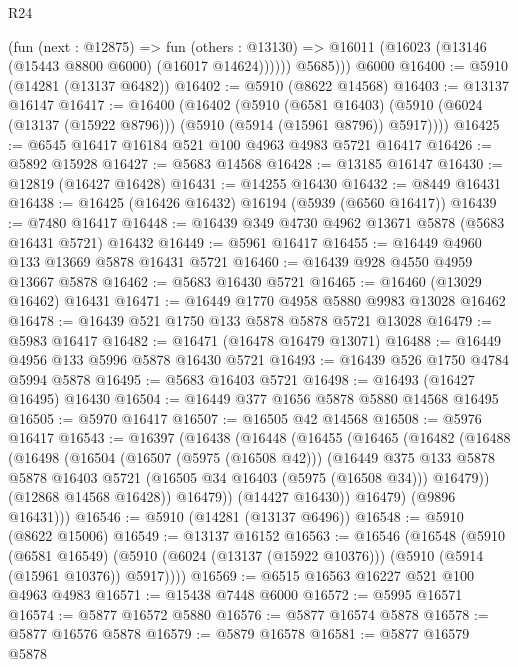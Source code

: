 \begin{lexlean}{R24}
\begin{coremodule}
            (fun (next : @12875) =>
            fun (others : @13130) =>
            @16011 (@16023 (@13146 (@15443 @8800 @6000) (@16017 @14624))))))
          @5685)))
    @6000
@16400 := @5910 (@14281 (@13137 @6482))
@16402 := @5910 (@8622 @14568)
@16403 := @13137 @16147
@16417 := @16400
    (@16402
      (@5910
        (@6581 @16403)
        (@5910 (@6024 (@13137 (@15922 @8796))) (@5910 (@5914 (@15961 @8796)) @5917))))
@16425 := @6545 @16417 @16184 @521 @100 @4963 @4983 @5721 @16417
@16426 := @5892 @15928
@16427 := @5683 @14568
@16428 := @13185 @16147
@16430 := @12819 (@16427 @16428)
@16431 := @14255 @16430
@16432 := @8449 @16431
@16438 := @16425 (@16426 @16432) @16194 (@5939 (@6560 @16417))
@16439 := @7480 @16417
@16448 := @16439 @349 @4730 @4962 @13671 @5878 (@5683 @16431 @5721) @16432
@16449 := @5961 @16417
@16455 := @16449 @4960 @133 @13669 @5878 @16431 @5721
@16460 := @16439 @928 @4550 @4959 @13667 @5878
@16462 := @5683 @16430 @5721
@16465 := @16460 (@13029 @16462) @16431
@16471 := @16449 @1770 @4958 @5880 @9983 @13028 @16462
@16478 := @16439 @521 @1750 @133 @5878 @5878 @5721 @13028
@16479 := @5983 @16417
@16482 := @16471 (@16478 @16479 @13071)
@16488 := @16449 @4956 @133 @5996 @5878 @16430 @5721
@16493 := @16439 @526 @1750 @4784 @5994 @5878
@16495 := @5683 @16403 @5721
@16498 := @16493 (@16427 @16495) @16430
@16504 := @16449 @377 @1656 @5878 @5880 @14568 @16495
@16505 := @5970 @16417
@16507 := @16505 @42 @14568
@16508 := @5976 @16417
@16543 := @16397
    (@16438
      (@16448
        (@16455
          (@16465
            (@16482
              (@16488
                (@16498
                  (@16504
                    (@16507 (@5975 (@16508 @42)))
                    (@16449
                      @375
                      @133
                      @5878
                      @5878
                      @16403
                      @5721
                      (@16505 @34 @16403 (@5975 (@16508 @34)))
                      @16479))
                  (@12868 @14568 @16428))
                @16479))
            (@14427 @16430))
          @16479)
        (@9896 @16431)))
@16546 := @5910 (@14281 (@13137 @6496))
@16548 := @5910 (@8622 @15006)
@16549 := @13137 @16152
@16563 := @16546
    (@16548
      (@5910
        (@6581 @16549)
        (@5910 (@6024 (@13137 (@15922 @10376))) (@5910 (@5914 (@15961 @10376)) @5917))))
@16569 := @6515 @16563 @16227 @521 @100 @4963 @4983
@16571 := @15438 @7448 @6000
@16572 := @5995 @16571
@16574 := @5877 @16572 @5880
@16576 := @5877 @16574 @5878
@16578 := @5877 @16576 @5878
@16579 := @5879 @16578
@16581 := @5877 @16579 @5878

\end{coremodule}
\end{lexlean}
